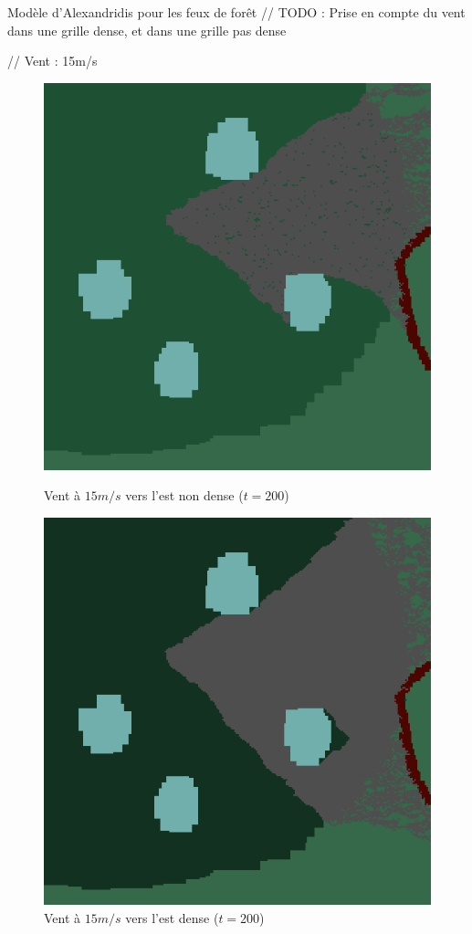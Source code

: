 \documentclass{beamer}
\begin{document}
\begin{frame}{Modèle d'Alexandridis pour les feux de forêt \hyperlink{jump}{\beamerbutton{ }} \hypertarget{10}{\beamerbutton{ }}}
    // TODO : Prise en compte du vent dans une grille dense, et dans une grille pas dense

    // Vent : 15m/s

    \begin{figure}[!htb]
        \begin{minipage}{0.48\textwidth}
          \centering
          \includegraphics[width=.8\linewidth]{pictures/model2/land_200_wind_notdense.png}
          \caption{Vent à $15m/s$ vers l'est non dense ($t=200$)}\label{Fig:Data1}
        \end{minipage}\hfill
        \begin{minipage}{0.48\textwidth}
          \centering
          \includegraphics[width=.8\linewidth]{pictures/model2/land_200_wind_dense.png}
          \caption{Vent à $15m/s$ vers l'est dense ($t=200$)}\label{Fig:Data2}
        \end{minipage}
     \end{figure}
\end{frame}
\end{document}

